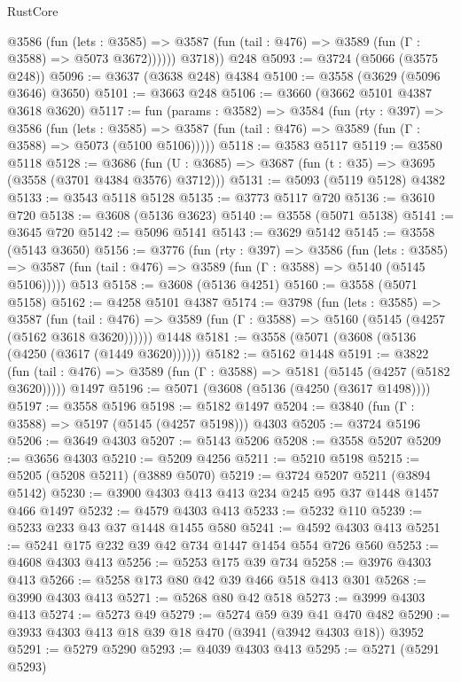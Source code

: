 \begin{lexlean}{RustCore}
\begin{coremodule}
            @3586
              (fun (lets : @3585) =>
              @3587 (fun (tail : @476) => @3589 (fun (Γ : @3588) => @5073 @3672))))))
        @3718))
    @248
@5093 := @3724 (@5066 (@3575 @248))
@5096 := @3637 (@3638 @248) @4384
@5100 := @3558 (@3629 (@5096 @3646) @3650)
@5101 := @3663 @248
@5106 := @3660 (@3662 @5101 @4387 @3618 @3620)
@5117 := fun (params : @3582) =>
  @3584
    (fun (rty : @397) =>
    @3586
      (fun (lets : @3585) =>
      @3587 (fun (tail : @476) => @3589 (fun (Γ : @3588) => @5073 (@5100 @5106)))))
@5118 := @3583 @5117
@5119 := @3580 @5118
@5128 := @3686 (fun (U : @3685) => @3687 (fun (t : @35) => @3695 (@3558 (@3701 @4384 @3576) @3712)))
@5131 := @5093 (@5119 @5128) @4382
@5133 := @3543 @5118 @5128
@5135 := @3773 @5117 @720
@5136 := @3610 @720
@5138 := @3608 (@5136 @3623)
@5140 := @3558 (@5071 @5138)
@5141 := @3645 @720
@5142 := @5096 @5141
@5143 := @3629 @5142
@5145 := @3558 (@5143 @3650)
@5156 := @3776
    (fun (rty : @397) =>
    @3586
      (fun (lets : @3585) =>
      @3587 (fun (tail : @476) => @3589 (fun (Γ : @3588) => @5140 (@5145 @5106)))))
    @513
@5158 := @3608 (@5136 @4251)
@5160 := @3558 (@5071 @5158)
@5162 := @4258 @5101 @4387
@5174 := @3798
    (fun (lets : @3585) =>
    @3587
      (fun (tail : @476) => @3589 (fun (Γ : @3588) => @5160 (@5145 (@4257 (@5162 @3618 @3620))))))
    @1448
@5181 := @3558 (@5071 (@3608 (@5136 (@4250 (@3617 (@1449 @3620))))))
@5182 := @5162 @1448
@5191 := @3822
    (fun (tail : @476) => @3589 (fun (Γ : @3588) => @5181 (@5145 (@4257 (@5182 @3620)))))
    @1497
@5196 := @5071 (@3608 (@5136 (@4250 (@3617 @1498))))
@5197 := @3558 @5196
@5198 := @5182 @1497
@5204 := @3840 (fun (Γ : @3588) => @5197 (@5145 (@4257 @5198))) @4303
@5205 := @3724 @5196
@5206 := @3649 @4303
@5207 := @5143 @5206
@5208 := @3558 @5207
@5209 := @3656 @4303
@5210 := @5209 @4256
@5211 := @5210 @5198
@5215 := @5205 (@5208 @5211) (@3889 @5070)
@5219 := @3724 @5207 @5211 (@3894 @5142)
@5230 := @3900 @4303 @413 @413 @234 @245 @95 @37 @1448 @1457 @466 @1497
@5232 := @4579 @4303 @413
@5233 := @5232 @110
@5239 := @5233 @233 @43 @37 @1448 @1455 @580
@5241 := @4592 @4303 @413
@5251 := @5241 @175 @232 @39 @42 @734 @1447 @1454 @554 @726 @560
@5253 := @4608 @4303 @413
@5256 := @5253 @175 @39 @734
@5258 := @3976 @4303 @413
@5266 := @5258 @173 @80 @42 @39 @466 @518 @413 @301
@5268 := @3990 @4303 @413
@5271 := @5268 @80 @42 @518
@5273 := @3999 @4303 @413
@5274 := @5273 @49
@5279 := @5274 @59 @39 @41 @470 @482
@5290 := @3933 @4303 @413 @18 @39 @18 @470 (@3941 (@3942 @4303 @18)) @3952
@5291 := @5279 @5290
@5293 := @4039 @4303 @413
@5295 := @5271 (@5291 @5293)

\end{coremodule}
\end{lexlean}
